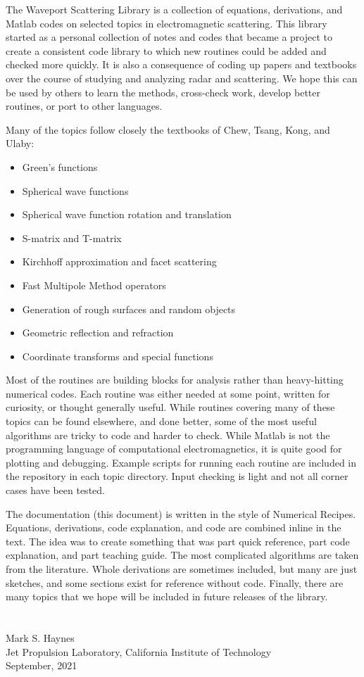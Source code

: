 
The Waveport Scattering Library is a collection of equations, derivations, and Matlab codes on selected topics in electromagnetic scattering. This library started as a personal collection of notes and codes that became a project to create a consistent code library to which new routines could be added and checked more quickly. It is also a consequence of coding up papers and textbooks over the course of studying and analyzing radar and scattering. We hope this can be used by others to learn the methods, cross-check work, develop better routines, or port to other languages. 

Many of the topics follow closely the textbooks of Chew, Tsang, Kong, and Ulaby:
\begin{itemize}
  \setlength{\itemsep}{1pt}
  \setlength{\parskip}{0pt}
  \setlength{\parsep}{0pt}
\item Green's functions
\item Spherical wave functions
\item Spherical wave function rotation and translation
\item S-matrix and T-matrix
\item Kirchhoff approximation and facet scattering
\item Fast Multipole Method operators
\item Generation of rough surfaces and random objects
\item Geometric reflection and refraction
\item Coordinate transforms and special functions
\end{itemize}

Most of the routines are building blocks for analysis rather than heavy-hitting numerical codes. Each routine was either needed at some point, written for curiosity, or thought generally useful. While routines covering many of these topics can be found elsewhere, and done better, some of the most useful algorithms are tricky to code and harder to check. While Matlab is not the programming language of computational electromagnetics, it is quite good for plotting and debugging. Example scripts for running each routine are included in the repository in each topic directory. Input checking is light and not all corner cases have been tested. 

The documentation (this document) is written in the style of Numerical Recipes. Equations, derivations, code explanation, and code are combined inline in the text. The idea was to create something that was part quick reference, part code explanation, and part teaching guide. The most complicated algorithms are taken from the literature. Whole derivations are sometimes included, but many are just sketches, and some sections exist for reference without code. Finally, there are many topics that we hope will be included in future releases of the library.  \\
\\
\\
Mark S. Haynes \\
Jet Propulsion Laboratory, California Institute of Technology \\
September, 2021 \\

